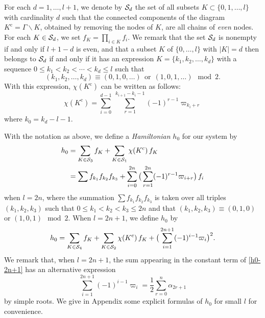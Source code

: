 For each $d=1,\ldots,l+1$, we denote by ${\cal S}_d$ the set of all subsets 
$K\subset\{0,1,\ldots,l\}$ with cardinality $d$ such that the connected components 
of the diagram $K^{\text{c}}=\Gamma\backslash K$,
obtained by removing the nodes of $K$, are all chains of
{\em even} nodes. 
For each $K\in {\cal S}_d$, we set $f_K=\prod_{i\in K} f_i$. 
We remark that the set ${\cal S}_d$ is nonempty if and only if $l+1-d$ is even, 
and that a subset $K$ of $\{0,\ldots,l\}$ with $|K|=d$ then belongs to ${\cal S}_d$ 
if and only if it has an expression $K=\{k_1,k_2,\ldots,k_d\}$ with a sequence 
$0\le k_1<k_2<\cdots<k_d\le l$ such that
\begin{equation}
(k_1,k_2,\ldots,k_d)\equiv (0,1,0,\ldots) \ \ \text{or} \ \ (1,0,1,\ldots)\mod 2. 
\end{equation}
With this expression, $\chi(K^{\text{c}})$ can be written as follows:
\begin{equation}
\chi(K^{\text{c}})=\sum_{i=0}^{d-1}\ \sum_{r=1}^{k_{i+1}-k_i-1}(-1)^{r-1}\varpi_{k_i+r}
\end{equation}
where $k_0=k_d-l-1$. 

\medskip
With the notation as above, 
we define a {\em Hamiltonian} $h_0$ for our system by
\begin{equation}\Label{h0-2n}
\begin{align}
h_0&=\sum_{K\in{\cal S}_3} f_K +\sum_{K\in{\cal S}_1} \chi(K^{\text{c}})\, f_K\\
&=\sum f_{k_1} f_{k_2} f_{k_3}   
+\sum_{i=0}^{2n} \big(\sum_{r=1}^{2n}(-1)^{r-1}\varpi_{i+r}\big)\,f_i
\notag
\end{align}
\end{equation}
when $l=2n$, 
where the summation $\sum f_{k_1} f_{k_2} f_{k_3}$ is taken over all triples 
$(k_1,k_2,k_3)$ such that $0\le k_1<k_2<k_3\le 2n$ and that 
$(k_1,k_2,k_3)\equiv (0,1,0)$ or $(1,0,1) \mod 2$.  
When $l=2n+1$, we define $h_0$ by
\begin{equation}\Label{h0-2n+1}
h_0=\sum_{K\in{\cal S}_4} f_K + \sum_{K\in{\cal S}_2} \chi(K^{\text{c}})\,f_K
+\big(\sum_{i=1}^{2n+1}(-1)^{i-1} \varpi_i\big)^2.
\end{equation}
We remark that, when $l=2n+1$, the sum appearing in the constant term 
of \eqref{h0-2n+1} has an alternative 
expression 
\begin{equation}
\sum_{i=1}^{2n+1}(-1)^{i-1} \varpi_i=\frac{1}{2}\sum_{r=0}^n \alpha_{2r+1}
\end{equation}
by simple roots. 
We give in Appendix some explicit formulas of $h_0$ for small $l$ for convenience. 

